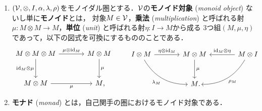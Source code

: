 \documentclass[uplatex,a4paper,dvipdfmx]{jsarticle}
\begin{document}
\begin{dfn}
\begin{enumerate}
        \item $({\mathcal{V}}, \otimes, I, \alpha, \lambda, \rho)$をモノイダル圏とする．${\mathcal{V}}$の\textbf{モノイド対象} (\textit{monoid object}) ないし単に\textbf{モノイド}とは，
            対象$M \in {\mathcal{V}}$，\textbf{乗法} (\textit{multiplication}) と呼ばれる射$\mu \colon M \otimes M \to M$，\textbf{単位} (\textit{unit}) と呼ばれる射$\eta \colon I \to M$から成る
            3つ組$(M, \mu, \eta)$であって，以下の図式を可換にするもののことである．
            \begin{equation}
                \label{equation:monoid}
                \begin{tikzcd}[sep=large]
                    M \otimes M \otimes M \arrow[r, "\mu \otimes \id_M"] \arrow[d, "\id_M \otimes \mu"'] & M \otimes M \arrow[d, "\mu"] \\
                    M \otimes M \arrow[r, "\mu"'] & M\rlap{,}
                \end{tikzcd}
                \qquad
                \begin{tikzcd}[sep=large]
                    I \otimes M \arrow[r, "\eta \otimes \id_M"] \arrow[rd, bend right, "\lambda_M"' name=X]
                        & M \otimes M \arrow[d, "\mu"] 
                        & \arrow[l, "\id_M \otimes \eta"'] M \otimes I \arrow[ld, bend left, "\rho_M" name=Y] \\
                        & M\rlap{.}
                \end{tikzcd}
            \end{equation}
        \item  \textbf{モナド} (\textit{monad}) とは，自己関手の圏におけるモノイド対象である．
    \end{enumerate}
\end{dfn}
\end{document}
